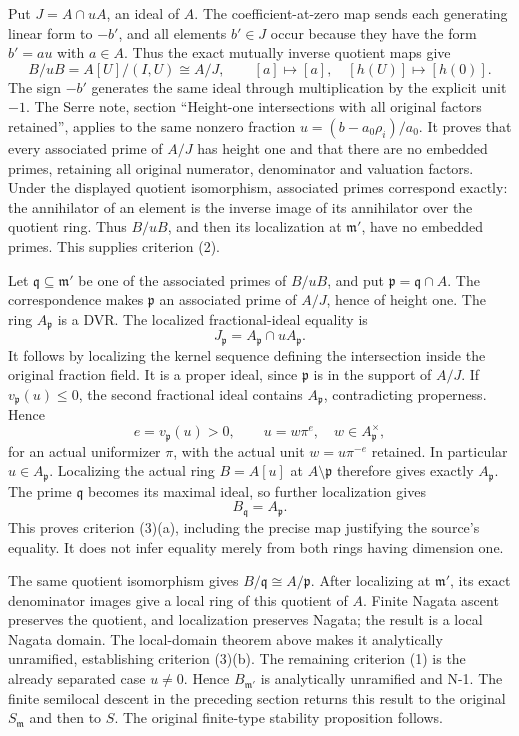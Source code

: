 Put \(J=A\cap uA\), an ideal of \(A\). The coefficient-at-zero map sends each generating linear form to \(-b'\), and all elements \(b'\in J\) occur because they have the form \(b'=au\) with \(a\in A\). Thus the exact mutually inverse quotient maps give \[
 B/uB=A[U]/(I,U)\cong A/J,
 \qquad [a]\longmapsto[a],\quad [h(U)]\longmapsto[h(0)].
\] The sign \(-b'\) generates the same ideal through multiplication by the explicit unit \(-1\). The Serre note, section ``Height-one intersections with all original factors retained'', applies to the same nonzero fraction \(u=(b-a_0\rho_i)/a_0\). It proves that every associated prime of \(A/J\) has height one and that there are no embedded primes, retaining all original numerator, denominator and valuation factors. Under the displayed quotient isomorphism, associated primes correspond exactly: the annihilator of an element is the inverse image of its annihilator over the quotient ring. Thus \(B/uB\), and then its localization at \(\mathfrak m'\), have no embedded primes. This supplies criterion (2).

Let \(\mathfrak q\subseteq\mathfrak m'\) be one of the associated primes of \(B/uB\), and put \(\mathfrak p=\mathfrak q\cap A\). The correspondence makes \(\mathfrak p\) an associated prime of \(A/J\), hence of height one. The ring \(A_{\mathfrak p}\) is a DVR. The localized fractional-ideal equality is \[
 J_{\mathfrak p}=A_{\mathfrak p}\cap uA_{\mathfrak p}.
\] It follows by localizing the kernel sequence defining the intersection inside the original fraction field. It is a proper ideal, since \(\mathfrak p\) is in the support of \(A/J\). If \(v_{\mathfrak p}(u)\leq0\), the second fractional ideal contains \(A_{\mathfrak p}\), contradicting properness. Hence \[
 e=v_{\mathfrak p}(u)>0,\qquad u=w\pi^e,
 \quad w\in A_{\mathfrak p}^{\times},
\] for an actual uniformizer \(\pi\), with the actual unit \(w=u\pi^{-e}\) retained. In particular \(u\in A_{\mathfrak p}\). Localizing the actual ring \(B=A[u]\) at \(A\setminus\mathfrak p\) therefore gives exactly \(A_{\mathfrak p}\). The prime \(\mathfrak q\) becomes its maximal ideal, so further localization gives \[
 B_{\mathfrak q}=A_{\mathfrak p}.
\] This proves criterion (3)(a), including the precise map justifying the source's equality. It does not infer equality merely from both rings having dimension one.

The same quotient isomorphism gives \(B/\mathfrak q\cong A/\mathfrak p\). After localizing at \(\mathfrak m'\), its exact denominator images give a local ring of this quotient of \(A\). Finite Nagata ascent preserves the quotient, and localization preserves Nagata; the result is a local Nagata domain. The local-domain theorem above makes it analytically unramified, establishing criterion (3)(b). The remaining criterion (1) is the already separated case \(u\ne0\). Hence \(B_{\mathfrak m'}\) is analytically unramified and N-1. The finite semilocal descent in the preceding section returns this result to the original \(S_{\mathfrak m}\) and then to \(S\). The original finite-type stability proposition follows.

